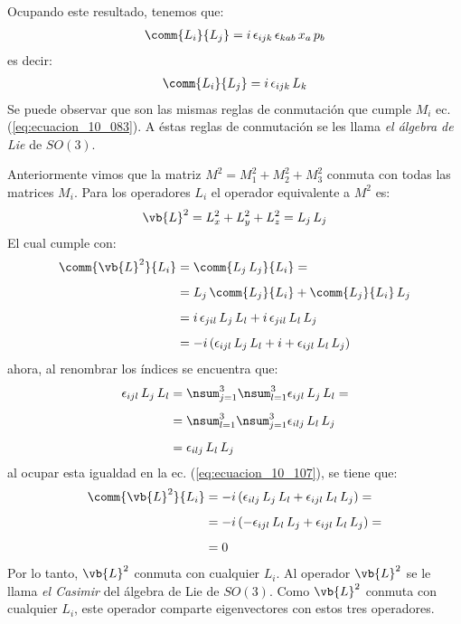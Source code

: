 Ocupando este resultado, tenemos que:
\begin{align*}
\comm{L_{i}}{L_{j}} = i \, \epsilon_{ijk} \, \epsilon_{kab} \, x_{a} \, p_{b}
\end{align*}
es decir:
\begin{align}
\comm{L_{i}}{L_{j}} = i \, \epsilon_{ijk} \, L_{k}
\label{eq:ecuacion_10_105}
\end{align}
Se puede observar que son las mismas reglas de conmutación que cumple $M_{i}$ ec. (\ref{eq:ecuacion_10_083}). A éstas reglas de conmutación se les llama \emph{el álgebra de Lie} de $SO(3)$.
\par
Anteriormente vimos que la matriz $M^{2} = M_{1}^{2} + M_{2}^{2} + M_{3}^{2}$ conmuta con todas las matrices $M_{i}$. Para los operadores $L_{i}$ el operador equivalente a $M^{2}$ es:
\begin{align}
\vb{L}^{2} = L_{x}^{2} + L_{y}^{2} + L_{z}^{2} = L_{j} \, L_{j} 
\label{eq:ecuacion_10_106}
\end{align}
El cual cumple con:
\begin{align}
\begin{aligned}[b]
\comm{\vb{L}^{2}}{L_{i}} &= \comm{L_{j} \, L_{j}}{L_{i}} = \\[0.5em]
&= L_{j} \, \comm{L_{j}}{L_{i}} + \comm{L_{j}}{L_{i}} \, L_{j} \\[0.5em]
&= i \, \epsilon_{jil} \, L_{j} \, L_{l} + i \, \epsilon_{jil} \, L_{l} \, L_{j} \\[0.5em]
&= - i \, (\epsilon_{ijl} \, L_{j} \, L_{l} + i + \epsilon_{ijl} \, L_{l} \, L_{j})
\end{aligned}
\label{eq:ecuacion_10_107}
\end{align}
ahora, al renombrar los índices se encuentra que:
\begin{align}
\begin{aligned}[b]
\epsilon_{ijl} \, L_{j} \, L_{l} &= \nsum_{j=1}^{3} \nsum_{l=1}^{3} \epsilon_{ijl} \, L_{j} \, L_{l} = \\[0.5em]
&= \nsum_{l=1}^{3} \nsum_{j=1}^{3} \epsilon_{ilj} \, L_{l} \, L_{j} \\[0.5em]
&= \epsilon_{ilj} \, L_{l} \, L_{j}
\end{aligned}
\label{eq:ecuacion_10_108}
\end{align}
al ocupar esta igualdad en la ec. (\ref{eq:ecuacion_10_107}), se tiene que:
\begin{align}
\begin{aligned}
\comm{\vb{L}^{2}}{L_{i}} &= - i \, (\epsilon_{ilj} \, L_{j} \, L_{l} + \epsilon_{ijl} \, L_{l} \, L_{j}) = \\[0.5em]
&= - i \, (- \epsilon_{ijl} \, L_{l} \, L_{j} + \epsilon_{ijl} \, L_{l} \, L_{j}) = \\[0.5em]
&= 0
\end{aligned}
\label{eq:ecuacion_10_109}
\end{align}
Por lo tanto, $\vb{L}^{2}$ conmuta con cualquier $L_{i}$. Al operador $\vb{L}^{2}$ se le llama \emph{el Casimir} del álgebra de Lie de $SO(3)$. Como $\vb{L}^{2}$ conmuta con cualquier $L_{i}$, este operador comparte eigenvectores con estos tres operadores.

